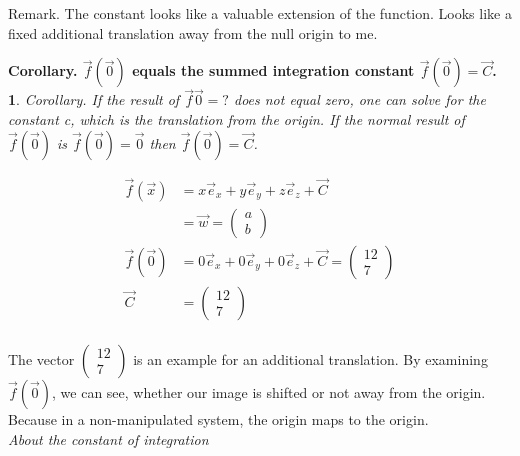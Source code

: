\documentclass[a4paper]{article}
\begin{document}
Remark. The constant looks like a valuable extension of the function. Looks like a fixed additional translation away from the null origin to me. \\

\newtheorem{CorollaryConstant}{Corollary. $\vec{f}(\vec{0})$ equals the summed integration constant $\vec{f}(\vec{0})=\vec{C}$.}
\begin{CorollaryConstant}
Corollary. If the result of $\vec{f}{\vec{0}}=?$ does not equal zero, one can solve for the constant c, which is the translation from the origin. If the normal result of $\vec{f}({\vec{0}})$ is $\vec{f}({\vec{0}})=\vec{0}$ then $\vec{f}({\vec{0}})=\vec{C}$.
\end{CorollaryConstant}

\begin{displaymath}
\begin{align}
\vec{f}(\vec{x}) &= x\vec{e}_{x} + y\vec{e}_{y} + z\vec{e}_{z} + \vec{C}\\ &= \vec{w} = \begin{pmatrix}a\\b\end{pmatrix}\\
\vec{f}(\vec{0}) &= 0\vec{e}_{x} + 0\vec{e}_{y} + 0\vec{e}_{z} + \vec{C} = \begin{pmatrix}12\\7\end{pmatrix}\\
\vec{C} &= \begin{pmatrix}12\\7\end{pmatrix}\\
\end{align}
\end{displaymath}

The vector $\begin{pmatrix}12\\7\end{pmatrix}$ is an example for an additional translation. By examining $\vec{f}(\vec{0})$, we can see, whether our image is shifted or not away from the origin. Because in a non-manipulated system, the origin maps to the origin. \\

\emph{About the constant of integration}\\
\end{document}
